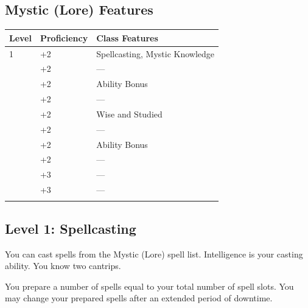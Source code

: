 \documentclass[12pt,letterpaper,twocolumn,openany,nodeprecatedcode,bg=none]{dndbook}
\let\oldsubsection\subsection
\renewcommand{\subsection}[1]{%
  \needspace{5\baselineskip}%
  \oldsubsection{#1}%
}
\begin{document}
\subsection{Mystic (Lore) Features}\label{mystic-lore-features}


{\def\LTcaptype{none} %
\begin{table}[!htbp]
\centering
\begin{tabular}{@{}
  >{\raggedright\arraybackslash}p{}
  >{\raggedright\arraybackslash}p{}
  >{\raggedright\arraybackslash}p{}@{}}
\toprule\noalign{}
\begin{minipage}[b]{\linewidth}\raggedright
Level
\end{minipage} & \begin{minipage}[b]{\linewidth}\raggedright
Proficiency
\end{minipage} & \begin{minipage}[b]{\linewidth}\raggedright
Class Features
\end{minipage} \\
\midrule\noalign{}
1 & +2 & Spellcasting, Mystic Knowledge \\
2 & +2 & --- \\
3 & +2 & Ability Bonus \\
4 & +2 & --- \\
5 & +2 & Wise and Studied \\
6 & +2 & --- \\
7 & +2 & Ability Bonus \\
8 & +2 & --- \\
9 & +3 & --- \\
10 & +3 & --- \\
\bottomrule\noalign{}
\end{tabular}
\end{table}
}

\subsection{Level 1: Spellcasting}\label{level-1-spellcasting}

You can cast spells from the Mystic (Lore) spell list. Intelligence is
your casting ability. You know two cantrips.

You prepare a number of spells equal to your total number of spell
slots. You may change your prepared spells after an extended period of
downtime.
\end{document}
